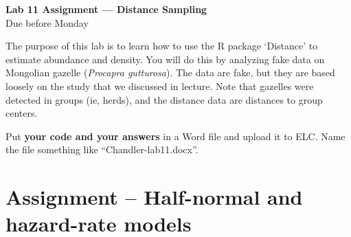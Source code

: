 \documentclass[12pt]{article}\usepackage[]{graphicx}\usepackage[]{color}
\begin{document}
{
  \Large
  \centering
  {\bf Lab 11 Assignment --- Distance Sampling \\ }
  Due before Monday \\
}

\vspace{24pt}

The purpose of this lab is to learn how to use the
R package `Distance' to estimate abundance and density. You will
do this by analyzing fake data on Mongolian gazelle ({\it Procapra
  gutturosa}). The data are fake, but they are based loosely on the
study that we discussed in lecture. Note that gazelles were detected
in groups (ie, herds), and the distance data are distances to group
centers. 

Put {\bf your code and your answers} in a Word file and upload it to
ELC. Name the file something like ``Chandler-lab11.docx''. 



\section*{Assignment -- Half-normal and hazard-rate models}
\end{document}
